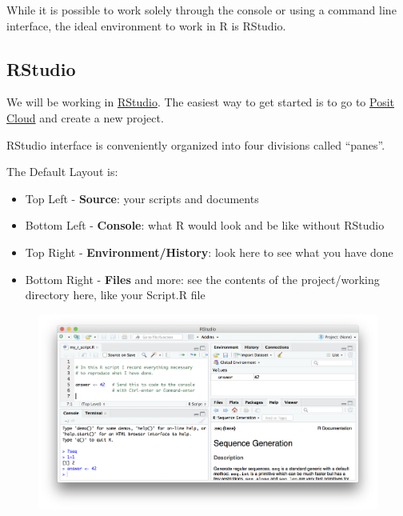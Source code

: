 \documentclass[
  letterpaper,
  DIV=11,
  numbers=noendperiod]{scrreprt}
\providecommand{\tightlist}{%
  \setlength{\itemsep}{0pt}\setlength{\parskip}{0pt}}\usepackage{longtable,booktabs,array}
\begin{document}
While it is possible to work solely through the console or using a
command line interface, the ideal environment to work in R is RStudio.

\hypertarget{rstudio}{%
\subsection{RStudio}\label{rstudio}}

We will be working in
\href{https://www.rstudio.com/products/rstudio/download/}{RStudio}. The
easiest way to get started is to go to \href{https://posit.cloud/}{Posit
Cloud} and create a new project.

RStudio interface is conveniently organized into four divisions called
``panes''.

The Default Layout is:

\begin{itemize}
\tightlist
\item
  Top Left - \textbf{Source}: your scripts and documents
\item
  Bottom Left - \textbf{Console}: what R would look and be like without
  RStudio
\item
  Top Right - \textbf{Environment/History}: look here to see what you
  have done
\item
  Bottom Right - \textbf{Files} and more: see the contents of the
  project/working directory here, like your Script.R file
\end{itemize}

\begin{figure}

{\centering \includegraphics[width=6.68in,height=\textheight]{./images/rstudio.png}

}

\end{figure}
\end{document}
